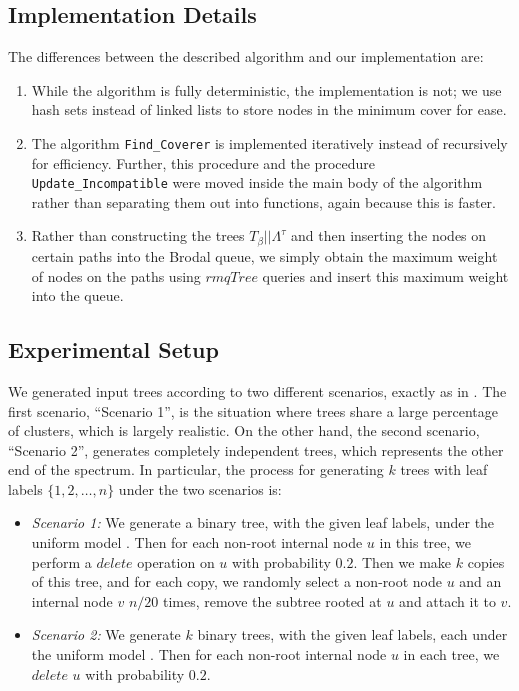\documentclass{article}
\newcommand{\leafset}{\Lambda}
\newcommand{\TB}{T_\beta}
\begin{document}
    \subsection{Implementation Details}
    \label{subsec:implementationdetails}

    The differences between the described algorithm and our implementation are:

    \begin{enumerate}
        \item While the algorithm is fully deterministic, the implementation is not; we use hash sets instead of linked lists to store nodes in the minimum cover for ease.

        \item The algorithm \texttt{Find\_Coverer} is implemented iteratively instead of recursively for efficiency. Further, this procedure and the procedure \texttt{Update\_Incompatible} were moved inside the main body of the algorithm rather than separating them out into functions, again because this is faster.

        \item Rather than constructing the trees $\TB||\leafset^{\tau}$ and then inserting the nodes on certain paths into the Brodal queue, we simply obtain the maximum weight of nodes on the paths using $rmqTree$ queries and insert this maximum weight into the queue.
    \end{enumerate}

    \subsection{Experimental Setup}
    \label{subsec:setup}

    We generated input trees according to two different scenarios, exactly as in \cite{jansson2018algorithms}. The first scenario, ``Scenario 1'', is the situation where trees share a large percentage of clusters, which is largely realistic. On the other hand, the second scenario, ``Scenario 2'', generates completely independent trees, which represents the other end of the spectrum. In particular, the process for generating $k$ trees with leaf labels $\{1, 2, \dots, n\}$ under the two scenarios is:

    \begin{itemize}
        \item \textit{Scenario 1:} We generate a binary tree, with the given leaf labels, under the uniform model \cite{mckenzie2000distributions}. Then for each non-root internal node $u$ in this tree, we perform a $delete$ operation on $u$ with probability $0.2$. Then we make $k$ copies of this tree, and for each copy, we randomly select a non-root node $u$ and an internal node $v$ $n / 20$ times, remove the subtree rooted at $u$ and attach it to $v$.

        \item \textit {Scenario 2:} We generate $k$ binary trees, with the given leaf labels, each under the uniform model \cite{mckenzie2000distributions}. Then for each non-root internal node $u$ in each tree, we $delete$ $u$ with probability $0.2$.
    \end{itemize}
\end{document}
